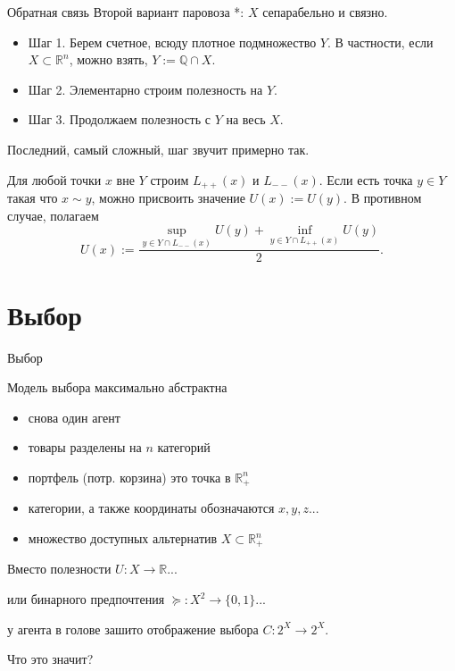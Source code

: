 \documentclass{beamer}
\begin{document}
\begin{frame}{Обратная связь}
Второй вариант паровоза *: $X$ сепарабельно и связно.

\begin{itemize}
  \item Шаг 1. Берем счетное, всюду плотное подмножество $Y$. В частности, если $X \subset \mathbb{R}^n$, можно взять, $Y :=\mathbb{Q} \cap X$.
  \item Шаг 2. Элементарно строим полезность на $Y$.
  \item Шаг 3. Продолжаем полезность с $Y$ на весь $X$.
\end{itemize}

Последний, самый сложный, шаг звучит примерно так. 

Для любой точки $x$ вне $Y$ строим $L_{++}(x)$ и $L_{--}(x)$. Если есть точка $y \in Y$ такая что $x \sim y$, можно присвоить значение $U(x) := U(y)$. В противном случае, полагаем
$$ U(x):= \dfrac{\sup_{y \in Y \cap L_{--}(x)} U(y) + \inf_{y \in Y \cap L_{++}(x)} U(y)}{2}.$$

\end{frame}


\section{Выбор}

\begin{frame}{Выбор}

Модель выбора максимально абстрактна

\begin{itemize}
\item снова один агент
\item товары разделены на $n$ категорий
\item портфель (потр. корзина) это точка в $\mathbb{R}_{+}^{n}$	
\item категории, а также координаты обозначаются $x, y, z...$
\item множество доступных альтернатив $X \subset \mathbb{R}_{+}^{n}$
\end{itemize}

Вместо полезности $U: X \to \mathbb{R}$...

или бинарного предпочтения $\succcurlyeq: X^2 \to \{0,1\}$...

у агента в голове зашито \alert{отображение выбора} $C: 2^X \to 2^X$. 

Что это значит?

\end{frame}
\end{document}
